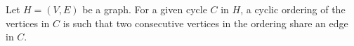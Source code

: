 \begin{definition}
    Let $H = (V,E)$ be a graph. 
    For a given cycle \(C\) in $H$, a cyclic ordering of the vertices in $C$ is such that two consecutive vertices in the ordering share an edge in $C$.
\end{definition}




